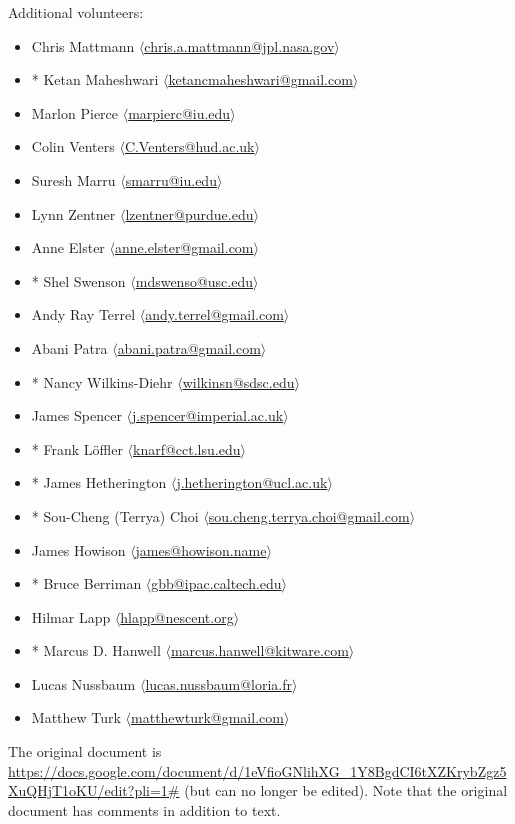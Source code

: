 \documentclass[11pt, oneside]{amsart}
\begin{document}
Additional volunteers:
\begin{itemize}
\item Chris Mattmann $\langle$\url{chris.a.mattmann@jpl.nasa.gov}$\rangle$
\item * Ketan Maheshwari $\langle$\url{ketancmaheshwari@gmail.com}$\rangle$
\item Marlon Pierce $\langle$\url{marpierc@iu.edu}$\rangle$
\item Colin Venters $\langle$\url{C.Venters@hud.ac.uk}$\rangle$
\item Suresh Marru $\langle$\url{smarru@iu.edu}$\rangle$
\item Lynn Zentner $\langle$\url{lzentner@purdue.edu}$\rangle$
\item Anne Elster $\langle$\url{anne.elster@gmail.com}$\rangle$
\item * Shel Swenson $\langle$\url{mdswenso@usc.edu}$\rangle$
\item Andy Ray Terrel $\langle$\url{andy.terrel@gmail.com}$\rangle$
\item Abani Patra $\langle$\url{abani.patra@gmail.com}$\rangle$
\item * Nancy Wilkins-Diehr $\langle$\url{wilkinsn@sdsc.edu}$\rangle$
\item James Spencer $\langle$\url{j.spencer@imperial.ac.uk}$\rangle$
\item * Frank L\"{o}ffler $\langle$\url{knarf@cct.lsu.edu}$\rangle$
\item * James Hetherington $\langle$\url{j.hetherington@ucl.ac.uk}$\rangle$
\item * Sou-Cheng (Terrya) Choi $\langle$\url{sou.cheng.terrya.choi@gmail.com}$\rangle$
\item James Howison $\langle$\url{james@howison.name}$\rangle$
\item * Bruce Berriman $\langle$\url{gbb@ipac.caltech.edu}$\rangle$
\item Hilmar Lapp $\langle$\url{hlapp@nescent.org}$\rangle$
\item * Marcus D. Hanwell $\langle$\url{marcus.hanwell@kitware.com}$\rangle$
\item Lucas Nussbaum $\langle$\url{lucas.nussbaum@loria.fr}$\rangle$
\item Matthew Turk $\langle$\url{matthewturk@gmail.com}$\rangle$
\end{itemize}

The original document is
\url{https://docs.google.com/document/d/1eVfioGNlihXG_1Y8BgdCI6tXZKrybZgz5XuQHjT1oKU/edit?pli=1#}
(but can no longer be edited).  Note that the original document has
comments in addition to text.
\end{document}
